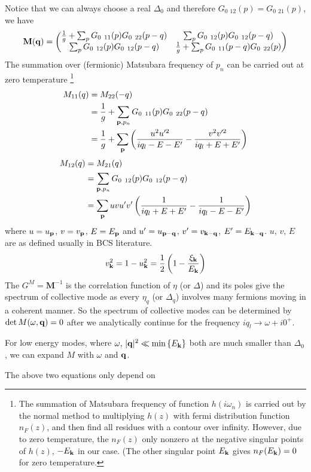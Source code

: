 Notice that we can always choose a real $\Delta_{0}$ and therefore $G_{0}{\ _{12}}(p)=G_{0}{\ _{21}}(p)$, we have 
\begin{equation}
\mathbf{M(q)}=
\begin{pmatrix}
\nth{g}+\sum_{p}G_{0}{\ }_{11}(p)G_{0}{\ }_{22}(p-q)&\sum_{p}G_{0}{\ }_{12}(p)G_{0}{\ }_{12}(p-q)\\
\sum_{p}G_{0}{\ }_{12}(p)G_{0}{\ }_{12}(p-q)&\nth{g}+\sum_{p}G_{0}{\ }_{11}(p-q)G_{0}{\ }_{22}(p)
\end{pmatrix}
\end{equation}
The summation over (fermionic) Matsubara frequency of $p_{n}$ can be carried out at zero temperature
\footnote{The summation of Matsubara frequency of function $h(i\omega_{n})$ is carried out by the normal method to multiplying $h(z)$ with fermi distribution function $n_{F}(z)$, and then find all residues with a contour over infinity.  However, due to zero temperature, the  $n_{F}(z)$ only nonzero at the negative singular points of $h(z)$, $-E_{\mathbf{k}}$ in our case.  (The other singular point $E_{\mathbf{k}}$ gives $n_{F}(E_{\mathbf{k}})=0$ for zero temperature.}
\begin{equation}
\begin{split}
M_{11}(q)&=M_{22}(-q)\\
	&=\nth{g}+\sum_{\vp{,}p_{n}}G_{0}{\ }_{11}(p)G_{0}{\ }_{22}(p-q)\\
	&=\nth{g}+\sum_{\vp}\br{\frac{u^{2}u'^{2}}{iq_{l}-E-E'}-\frac{v^{2}v'^{2}}{iq_{l}+E+E'}}
\end{split}
\end{equation}
\begin{equation}
\begin{split}
M_{12}(q)&=M_{21}(q)\\
	&=\sum_{\mathbf{p}{,}p_{n}}G_{0}{\ }_{12}(p)G_{0}{\ }_{12}(p-q)\\
	&=\sum_{\mathbf{p}}uvu'v'\left(\frac{1}{iq_{l}+E+E'}-\frac{1}{iq_{l}-E-E'}\right)
\end{split}
\end{equation}
where $u=u_{\mathbf{p}}$, $v=v_{\mathbf{p}}$, $E=E_{\mathbf{p}}$ and $u'=u_{\mathbf{p}-\mathbf{q}}$, $v'=v_{\mathbf{k}-\mathbf{q}}$, $E'=E_{\mathbf{k}-\mathbf{q}}$.  $u$, $v$, $E$ are as defined usually in BCS literature. 
\begin{equation}
v_{\mathbf{k}}^{2}=1-u_{\mathbf{k}}^{2}=\frac{1}{2}\left(1-\frac{\xi_{\mathbf{k}}}{E_{\mathbf{k}}}\right)
\end{equation}
 The $G^{M}=\mathbf{M}^{-1}$ is the correlation function of $\eta$ (or $\Delta$) and its poles give the spectrum of collective mode as every  $\eta_{q}$ (or $\Delta_{q}$) involves many fermions moving in a coherent manner.  So the spectrum of collective modes can be determined by $\det{M(\omega,\ensuremath{\mathbf{q}})}=0$ after we analytically continue for the frequency $iq_{l}\rightarrow\omega+i0^{+}$.  
 
For low energy modes, where $\omega,\,\lvert{\ensuremath{\mathbf{q}}}\rvert^{2}\ll\min\left\{E_{\mathbf{k}}\right\}$ both are much smaller than $\Delta_{0}$, we can expand $M$ with $\omega$ and $\mathbf{q}$.  



 The above two equations only depend on 
